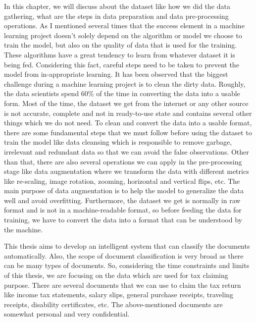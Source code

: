\par
In this chapter, we will discuss about the dataset like how we did the data gathering, what are the steps in data preparation and data pre-processing operations. As I mentioned several times that the success element in a machine learning project doesn't solely depend on the algorithm or model we choose to train the model, but also on the quality of data that is used for the training. These algorithms have a great tendency to learn from whatever dataset it is being fed. Considering this fact, careful steps need to be taken to prevent the model from in-appropriate learning. It has been observed that the biggest challenge during a machine learning project is to clean the dirty data. Roughly, the data scientists spend 60\% of the time in converting the data into a usable form. Most of the time, the dataset we get from the internet or any other source is not accurate, complete and not in ready-to-use state and contains several other things which we do not need. To clean and convert the data into a usable format, there are some fundamental steps that we must follow before using the dataset to train the model like data cleansing which is responsible to remove garbage, irrelevant and redundant data so that we can avoid the false observations. Other than that, there are also several operations we can apply in the pre-processing stage like data augmentation where we transform the data with different metrics like re-scaling, image rotation, zooming, horizontal and vertical flips, etc. The main purpose of data augmentation is to help the model to generalize the data well and avoid overfitting. Furthermore, the dataset we get is normally in raw format and is not in a machine-readable format, so before feeding the data for training, we have to convert the data into a format that can be understood by the machine.
\newline
\par
This thesis aims to develop an intelligent system that can classify the documents automatically. Also, the scope of document classification is very broad as there can be many types of documents. So, considering the time constraints and limits of this thesis, we are focusing on the data which are used for tax claiming purpose. There are several documents that we can use to claim the tax return like income tax statements, salary slips, general purchase receipts, traveling receipts, disability certificates, etc. The above-mentioned documents are somewhat personal and very confidential.
\newline
